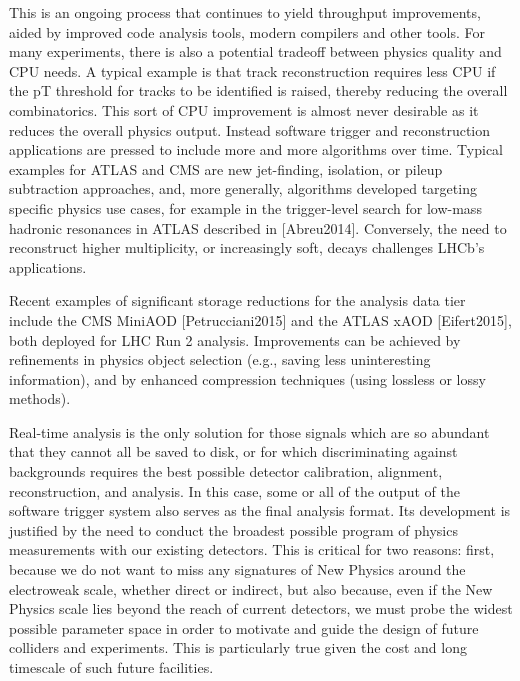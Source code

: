 This is an ongoing process that continues to yield throughput improvements, aided by improved code analysis tools, modern compilers and other tools. For many experiments, there is also a potential tradeoff between physics quality and CPU needs. A typical example is that track reconstruction requires less CPU if the pT threshold for tracks to be identified is raised, thereby reducing the overall combinatorics. This sort of CPU improvement is almost never desirable as it reduces the overall physics output. Instead software trigger and reconstruction applications are pressed to include more and more algorithms over time. Typical examples for ATLAS and CMS are new jet-finding, isolation, or pileup subtraction approaches, and, more generally, algorithms developed targeting specific physics use cases, for example in the trigger-level search for low-mass hadronic resonances in ATLAS described in [Abreu2014]. Conversely, the need to reconstruct higher multiplicity, or increasingly soft, decays challenges LHCb’s applications.

Recent examples of significant storage reductions for the analysis data tier include the CMS MiniAOD [Petrucciani2015] and the ATLAS xAOD [Eifert2015], both deployed for LHC Run 2 analysis. Improvements can be achieved by refinements in physics object selection (e.g., saving less uninteresting information), and by enhanced compression techniques (using lossless or lossy methods). 

Real-time analysis is the only solution for those signals which are so abundant that they cannot all be saved to disk, or for which discriminating against backgrounds requires the best possible detector calibration, alignment, reconstruction, and analysis. In this case, some or all of the output of the software trigger system also serves as the final analysis format. Its development is justified by the need to conduct the broadest possible program of physics measurements with our existing detectors. This is critical for two reasons: first, because we do not want to miss any signatures of New Physics around the electroweak scale, whether direct or indirect, but also because, even if the New Physics scale lies beyond the reach of current detectors, we must probe the widest possible parameter space in order to motivate and guide the design of future colliders and experiments. This is particularly true given the cost and long timescale of such future facilities.


